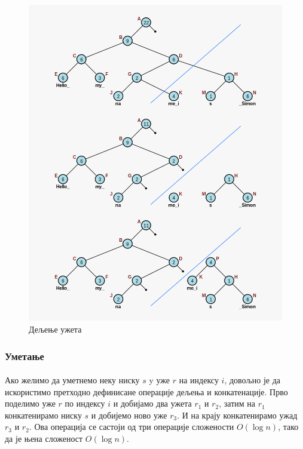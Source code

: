 \documentclass[12pt,oneside]{memoir}
\begin{document}
\begin{figure}
  \centering
  \includegraphics[width=1.0\textwidth]{images/rope_split.png}
  \caption{Дељење ужета}
  \label{fig:ropesplit}
\end{figure} 

\subsubsection{Уметање}
\paragraph{}
Ако желимо да уметнемо неку ниску \(s\) y уже \(r\) на индексу \(i\), довољно је да искористимо претходно дефинисане операције дељења и конкатенације. Прво поделимо уже \(r\) по индексу \(i\)
и добијамо два ужета \(r_1\) и \(r_2\), затим на \(r_1\) конкатенирамо ниску \(s\) и добијемо
ново уже \(r_3\). И на крају конкатенирамо ужад \(r_3\) и \(r_2\). Ова операција се састоји
од три операције сложености \(O(\log{}n)\), тако да је њена сложеност \(O(\log{}n)\).
\end{document}
